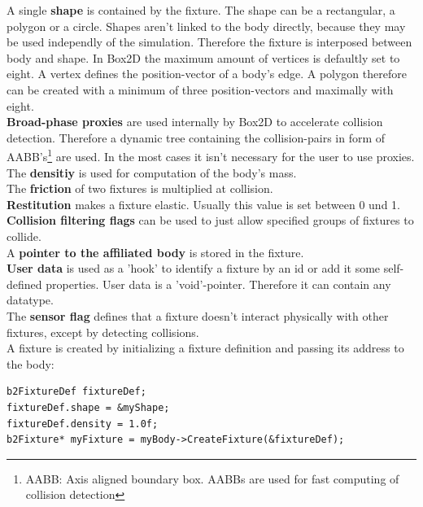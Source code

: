 \documentclass[10pt,a4paper,DIV=11]{scrreprt}
\begin{document}
A single \textbf{shape} is contained by the fixture. The shape can be a rectangular, a polygon or a circle. Shapes aren't linked to the body directly, because they may be used independly of the simulation. Therefore the fixture is interposed between body and shape. In Box2D the maximum amount of vertices is defaultly set to eight. A vertex defines the position-vector of a body's edge. A polygon therefore can be created with a minimum of three position-vectors and maximally with eight.
\\

\textbf{Broad-phase proxies} are used internally by Box2D to accelerate collision detection. Therefore a dynamic tree containing the collision-pairs in form of AABB's\footnote{AABB: Axis aligned boundary box. AABBs are used for fast computing of collision detection} are used. In the most cases it isn't necessary for the user to use proxies. \\

The \textbf{densitiy} is used for computation of the body's mass.\\

The \textbf{friction} of two fixtures is multiplied at collision. \\

\textbf{Restitution} makes a fixture elastic. Usually this value is set between 0 und 1. \\

\textbf{Collision filtering flags} can be used to just allow specified groups of fixtures to collide. \\

A \textbf{pointer to the affiliated body} is stored in the fixture.\\

\textbf{User data} is used as a 'hook' to identify a fixture by an id or add it some self-defined properties. User data is a 'void'-pointer. Therefore it can contain any datatype. \\

The \textbf{sensor flag} defines that a fixture doesn't interact physically with other fixtures, except by detecting collisions. \\



A fixture is created by initializing a fixture definition and passing its address to the body:

\begin{lstlisting}[caption={Creation of a fixture (source Box2D manual)},label=lst:fixture-create]
b2FixtureDef fixtureDef;
fixtureDef.shape = &myShape;
fixtureDef.density = 1.0f;
b2Fixture* myFixture = myBody->CreateFixture(&fixtureDef);
\end{lstlisting}
\end{document}
